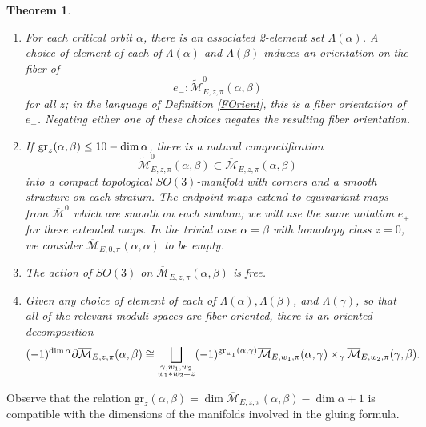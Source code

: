 \documentclass[10pt,a4paper]{amsart}
\newtheorem{theorem}{Theorem}
\theoremstyle{definition}
\theoremstyle{remark}
\numberwithin{figure}{qchap}
\begin{document}
\begin{theorem}
\begin{enumerate}
\item For each critical orbit $\alpha$, there is an associated 2-element set $\Lambda(\alpha)$. A choice of element of each of $\Lambda(\alpha)$ and $\Lambda(\beta)$ induces an orientation on the fiber of $$e_-: \widetilde{\mathcal M}^0_{E,z,\pi}(\alpha, \beta)$$ for all $z$; in the language of Definition \ref{FOrient}, this is a fiber orientation of $e_-$. Negating either one of these choices negates the resulting fiber orientation.\\
\item If $\textup{gr}_z(\alpha, \beta) \leq 10 - \dim \alpha$, there is a natural compactification $$\widetilde{\mathcal M}^0_{E,z,\pi}(\alpha, \beta) \subset \overline{\mathcal M}_{E,z,\pi}(\alpha, \beta)$$ into a compact topological $SO(3)$-manifold with corners and a smooth structure on each stratum. The endpoint maps extend to equivariant maps from $\overline{\mathcal M}^0$ which are smooth on each stratum; we will use the same notation $e_\pm$ for these extended maps. In the trivial case $\alpha = \beta$ with homotopy class $z = 0$, we consider $\overline{\mathcal M}_{E,0,\pi}(\alpha, \alpha)$ to be empty.\\
\item The action of $SO(3)$ on $\overline{\mathcal M}_{E,z,\pi}(\alpha, \beta)$ is free.\\
\item Given any choice of element of each of $\Lambda(\alpha), \Lambda(\beta)$, and $\Lambda(\gamma)$, so that all of the relevant moduli spaces are fiber oriented, there is an oriented decomposition $$(-1)^{\dim \alpha}\partial \overline{\mathcal M}_{E,z,\pi}(\alpha, \beta) \cong \bigsqcup_{\substack{\gamma, w_1, w_2 \\ w_1 \ast w_2 = z}} (-1)^{\textup{gr}_{w_1}(\alpha, \gamma)} \overline{\mathcal M}_{E,w_1,\pi}(\alpha, \gamma) \times_\gamma \overline{\mathcal M}_{E,w_2,\pi}(\gamma, \beta).$$
\end{enumerate}
\end{theorem}

Observe that the relation $\text{gr}_z(\alpha, \beta) = \dim \overline{\mathcal M}_{E,z,\pi}(\alpha, \beta) - \dim \alpha + 1$ is compatible with the dimensions of the manifolds involved in the gluing formula.
\end{document}
